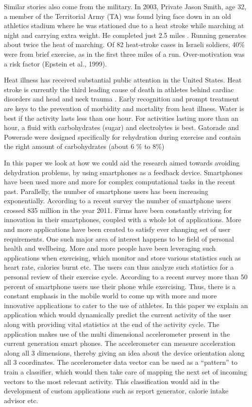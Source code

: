 \documentclass[conference]{IEEEtran}
\begin{document}
Similar stories also come from the military. In 2003, Private Jason Smith, age 32, a member of the Territorial Army (TA) was found lying face down in an old athletics stadium where he was stationed due to a heat stroke while marching at night and carrying extra weight. He completed just 2.5 miles \cite{ref3}. Running generates about twice the heat of marching. Of 82 heat-stroke cases in Israeli soldiers, 40\% were from brief exercise, as in the first three miles of a run. Over-motivation was a risk factor (Epstein et al., 1999).

Heat illness has received substantial public attention in the United States. Heat stroke is currently the third leading cause of death in athletes behind cardiac disorders and head and neck trauma \cite{ref4}. Early recognition and prompt treatment are keys to the prevention of morbidity and mortality from heat illness. Water is best if the activity lasts less than one hour. For activities lasting more than an hour, a fluid with carbohydrates (sugar) and electrolytes is best. Gatorade and Powerade were designed specifically for rehydration during exercise and contain the right amount of carbohydrates (about 6 \% to 8\%)  \cite{ref5}

 In this paper we look at how we could aid the research aimed towards avoiding dehydration problems, by using smartphones as a feedback device. Smartphones have been used more and more for complex computational tasks in the recent past. Parallelly, the number of smartphone users has been increasing exponentially. According to a recent survey \cite{ref6} the number of smartphone users crossed 835 million in the year 2011. Firms have been constantly striving for innovation in their smartphones, coupled with a whole lot of applications. More and more applications have been created to satisfy ever changing set of user requirements. One such major area of interest happens to be field of personal health and wellbeing. More and more people have been leveraging such applications when exercising, which monitor and store various statistics such as heart rate, calories burnt etc. The users can thus analyze such statistics for a personal review of their exercise cycle. According to a recent survey \cite{ref7} more than 50 percent of smartphone users use their phone while exercising. Thus, there is a constant emphasis in the mobile world to come up with more and more innovative applications to cater to the use of athletes. In this paper we explain an application which would dynamically predict the current activity of the user along with providing vital statistics at the end of the activity cycle. The application makes use of the multi dimensional accelerometer present in the current generation smart phones. The accelerometer can measure acceleration along all 3 dimensions, thereby giving an idea about the device orientation along all 3 coordinates. The accelerometer data vector can be used as a “pattern” to train a classifier, which would then take care of mapping the next set of incoming vectors to the most relevant activity. This classification would aid in the development of custom applications such as report generator, calorie intake advisor etc.
\end{document}
